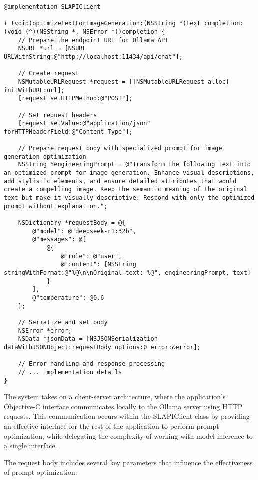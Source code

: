 \begin{verbatim}
@implementation SLAPIClient

+ (void)optimizeTextForImageGeneration:(NSString *)text completion:(void (^)(NSString *, NSError *))completion {
    // Prepare the endpoint URL for Ollama API
    NSURL *url = [NSURL URLWithString:@"http://localhost:11434/api/chat"];
    
    // Create request
    NSMutableURLRequest *request = [[NSMutableURLRequest alloc] initWithURL:url];
    [request setHTTPMethod:@"POST"];
    
    // Set request headers
    [request setValue:@"application/json" forHTTPHeaderField:@"Content-Type"];
    
    // Prepare request body with specialized prompt for image generation optimization
    NSString *engineeringPrompt = @"Transform the following text into an optimized prompt for image generation. Enhance visual descriptions, add stylistic elements, and ensure detailed attributes that would create a compelling image. Keep the semantic meaning of the original text but make it visually descriptive. Respond with only the optimized prompt without explanation.";
    
    NSDictionary *requestBody = @{  
        @"model": @"deepseek-r1:32b",
        @"messages": @[
            @{
                @"role": @"user",
                @"content": [NSString stringWithFormat:@"%@\n\nOriginal text: %@", engineeringPrompt, text]
            }
        ],
        @"temperature": @0.6
    };
    
    // Serialize and set body
    NSError *error;
    NSData *jsonData = [NSJSONSerialization dataWithJSONObject:requestBody options:0 error:&error];
    
    // Error handling and response processing
    // ... implementation details
}
\end{verbatim}

The system takes on a client-server architecture, where the application's Objective-C interface communicates locally to the Ollama server using HTTP requests. This communication occurs within the SLAPIClient class by providing an effective interface for the rest of the application to perform prompt optimization, while delegating the complexity of working with model inference to a single interface.


The request body includes several key parameters that influence the effectiveness of prompt optimization:

